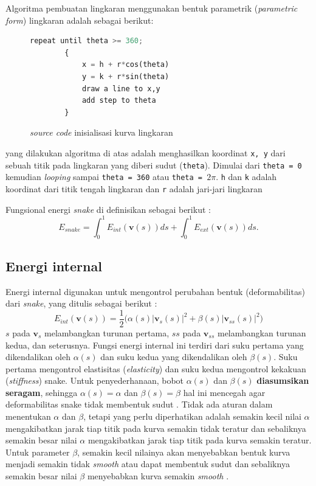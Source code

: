 Algoritma pembuatan lingkaran menggunakan bentuk parametrik (\emph{parametric form}) lingkaran adalah sebagai berikut:
\begin{figure}[H]
	\begin{lstlisting}[language=Python, basicstyle=\tiny]
		repeat until theta >= 360;
		{ 
			x = h + r*cos(theta)
			y = k + r*sin(theta)
			draw a line to x,y
			add step to theta
		}
	\end{lstlisting}
	\caption{\emph{source code} inisialisasi kurva lingkaran}
	\label{Gambar:algo_circle}
\end{figure}
yang dilakukan algoritma di atas adalah menghasilkan koordinat \texttt{x, y} dari sebuah titik pada lingkaran yang diberi sudut (\texttt{theta}). Dimulai dari \texttt{theta = 0} kemudian \emph{looping} sampai \texttt{theta = 360} atau \texttt{theta = $2\pi$}. \texttt{h} dan \texttt{k} adalah koordinat dari titik tengah lingkaran dan \texttt{r} adalah jari-jari lingkaran \citep{john_page}

Fungsional energi \emph{snake} di definisikan sebagai berikut \citep{abdullah2016robust}:
\begin{equation}
	\label{eq_1}
	E_{snake} = \int^1_0 E_{int}(\textbf{v}(s)) ds + \int^1_0 E_{ext}(\textbf{v}(s)) ds.
\end{equation}

\subsection{Energi internal}
Energi internal digunakan untuk mengontrol perubahan bentuk (deformabilitas) dari \emph{snake}, yang ditulis sebagai berikut \citep{abdullah2016robust}:
\begin{equation}
	\label{eq_2}
	E_{int}(\textbf{v}(s)) = \frac{1}{2}  \biggl( \alpha(s)|\textbf{v}_{s}(s)|^2 + \beta(s)|\textbf{v}_{ss}(s)|^2 \biggr)
\end{equation}
$s$ pada $\textbf{v}_{s}$ melambangkan turunan pertama, $ss$ pada $\textbf{v}_{ss}$ melambangkan turunan kedua, dan seterusnya. Fungsi energi internal ini terdiri dari suku pertama yang dikendalikan oleh $\alpha(s)$ dan suku kedua yang dikendalikan oleh $\beta(s)$. Suku pertama mengontrol elastisitas (\emph{elasticity}) dan suku kedua mengontrol kekakuan (\emph{stiffness}) snake. Untuk penyederhanaan, bobot $\alpha(s)$ dan $\beta(s)$ \textbf{diasumsikan seragam}, sehingga $\alpha(s) = \alpha$ dan $\beta(s) = \beta$ hal ini mencegah agar deformabilitas snake tidak membentuk sudut \citep{ivins1995everything}. Tidak ada aturan dalam menentukan $\alpha$ dan $\beta$, tetapi yang perlu diperhatikan adalah semakin kecil nilai $\alpha$ mengakibatkan jarak tiap titik pada kurva semakin tidak teratur dan sebaliknya semakin besar nilai $\alpha$ mengakibatkan jarak tiap titik pada kurva semakin teratur. Untuk parameter $\beta$, semakin kecil nilainya akan menyebabkan bentuk kurva menjadi semakin tidak \emph{smooth} atau dapat membentuk sudut dan sebaliknya semakin besar nilai $\beta$ menyebabkan kurva semakin \emph{smooth} \citep{ickhsan2020implementasi}.

